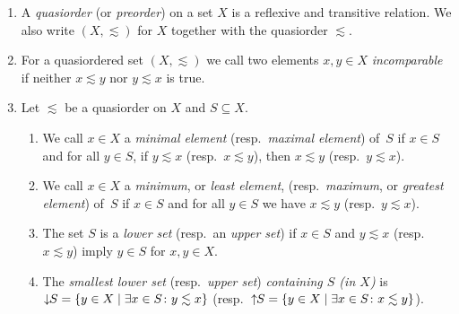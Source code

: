 \begin{enumerate}
	\item A \emph{quasiorder} (or \emph{preorder}) on a set $X$ is a reflexive and transitive relation. 
	We also write $(X, \lesssim)$ for $X$ together with the quasiorder $\lesssim$. 
	
	
	\item For a quasiordered set $(X, \lesssim)$
	we call two elements $x,y \in X$ \emph{incomparable} 
	if neither $x \lesssim y$ nor $y \lesssim x$ is true.
	
	\item Let $\lesssim$ be a quasiorder on $X$ and $S \subseteq X$.
	\begin{enumerate}   
		\item We call $x \in X$ a \emph{minimal element} (resp.~\emph{maximal element}) 
		of~$S$ if $x \in S$ and for all $y \in S$, 
		if $y \lesssim x$ (resp.~$x \lesssim y$), then $x \lesssim y$ (resp.~$y \lesssim x$).
		
				 
				\item We call $x \in X$ a \emph{minimum}, or \emph{least element},
				(resp.~\emph{maximum}, or \emph{greatest element}) 
				of~$S$ if $x \in S$ 
				and for all $y \in S$ we have $x \lesssim y$ (resp.~$y \lesssim x$).
				 
		
		 
		\item The set $S$ is a \emph{lower set} (resp.~an \emph{upper set}) if $x \in S$ and 
		$y \lesssim x$ (resp.~$x \lesssim y$) imply $y \in S$ for $x,y \in X$.  
		
		\label{def:genupperset}  
		\item The \emph{smallest lower set} (resp.~\emph{upper set}) \emph{containing $S$ (in $X$)}
		is $\downarrow \!\!S = \{ y \in X \mid \exists x \in S \colon y \lesssim x \}$
		(resp.~$\mbox{\ensuremath{\displaystyle \uparrow \!\!S}} = \{ y \in X \mid \exists x \in S \colon x \lesssim y \}$).
	\end{enumerate}

\begin{center}
\end{center}


\end{enumerate}
